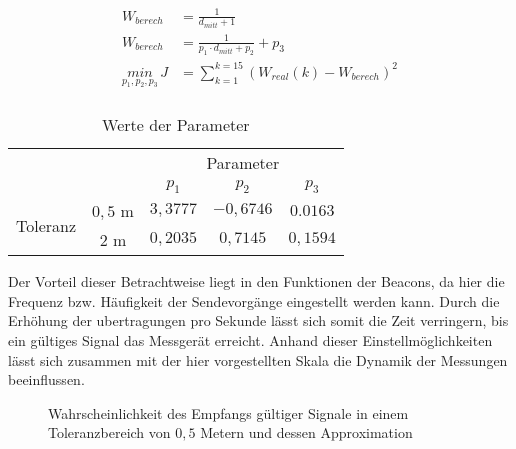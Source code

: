 \begin{align}
W_{berech}&=\frac{1}{d_{mitt}+1} \label{eq:Umkehrfunktion}\\
W_{berech}&=\frac{1}{p_1\cdot d_{mitt}+p_2} + p_3 \label{eq:eUmkehrfunktion}\\
\underset{p_1,p_2,p_3}{min}\, J&=\sum_{k=1}^{k=15}\left ( W_{real}\left ( k \right ) - W_{berech} \right )^{2} \label{eq:OptiUmkehrfunktion} \\
\end{align}
\begin{table}[H]
\begin{center}
\begin{tabular}{|c|c|c|c|c|}
\cline{3-5}
\multicolumn{2}{c|}{} & \multicolumn{3}{c|}{Parameter} \\
\cline{3-5}
\multicolumn{2}{c|}{} & $p_1$ & $p_2$ & $p_3$ \\
\hline
\multirow{2}{*}{Toleranz} & $0,5$ m & $3,3777$ & $-0,6746$ & $0.0163$\\
\cline{2-5}
& $2$ m & $0,2035$ & $0,7145$ & $0,1594$\\
\hline
\end{tabular}
\end{center}
\caption{Werte der Parameter}
\label{tab:ParameterwerteGuete}
\end{table} 
Der Vorteil dieser Betrachtweise liegt in den Funktionen der Beacons, da hier die Frequenz bzw. Häufigkeit der Sendevorgänge eingestellt werden kann. Durch die Erhöhung der ubertragungen pro Sekunde lässt sich somit die Zeit verringern, bis ein gültiges Signal das Messgerät erreicht. Anhand dieser Einstellmöglichkeiten lässt sich zusammen mit der hier vorgestellten Skala die Dynamik der Messungen beeinflussen. 
\begin{figure}[H] 
\centering
{}
\caption{Wahrscheinlichkeit des Empfangs gültiger Signale in einem Toleranzbereich von $0,5$ Metern und dessen Approximation}
\label{fig:GueteSauelengraph05}
\end{figure} 
